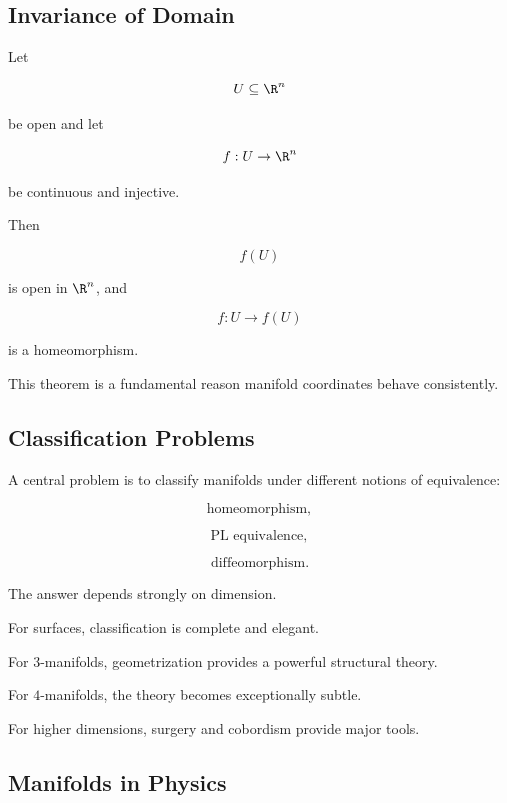 \subsection{Invariance of Domain}
\label{subsec:invariance-of-domain-manifolds}

\begin{theorem}
Let

\[
U\subseteq\R^n
\]

be open and let

\[
f:U\to\R^n
\]

be continuous and injective.

Then

\[
\boxed{
f(U)
}
\]

is open in \(\R^n\), and

\[
f:U\to f(U)
\]

is a homeomorphism.
\end{theorem}

This theorem is a fundamental reason manifold coordinates behave
consistently.

\subsection{Classification Problems}
\label{subsec:manifold-classification-problems}

A central problem is to classify manifolds under different notions of
equivalence:

\[
\boxed{
\text{homeomorphism},
}
\]

\[
\boxed{
\text{PL equivalence},
}
\]

\[
\boxed{
\text{diffeomorphism}.
}
\]

The answer depends strongly on dimension.

For surfaces, classification is complete and elegant.

For \(3\)-manifolds, geometrization provides a powerful structural theory.

For \(4\)-manifolds, the theory becomes exceptionally subtle.

For higher dimensions, surgery and cobordism provide major tools.

\subsection{Manifolds in Physics}
\label{subsec:manifolds-physics}


